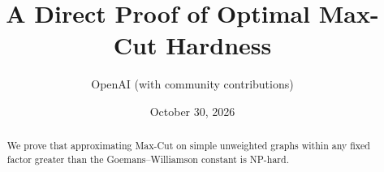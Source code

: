\documentclass[11pt]{article}
\title{A Direct Proof of Optimal Max-Cut Hardness}
\author{OpenAI (with community contributions)}
\date{October 30, 2026}
\numberwithin{equation}{section}
\theoremstyle{definition}
\theoremstyle{remark}
\begin{document}
\maketitle
\begin{abstract}
We prove that approximating Max-Cut on simple unweighted graphs within
any fixed factor greater than the Goemans--Williamson constant is NP-hard.
\end{abstract}











\appendix





\end{document}
